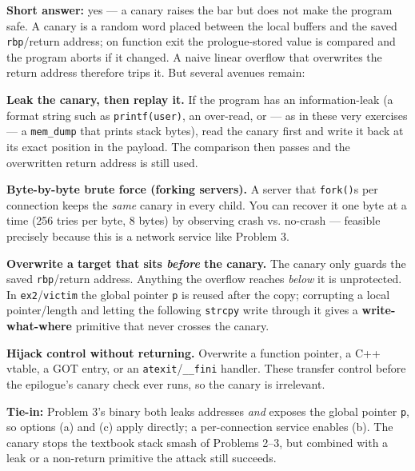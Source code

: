 \documentclass[a4paper, 10pt]{article}
\begin{document}
\begin{solution}
	\noindent \textbf{Short answer:} yes --- a canary raises the bar but does not make the program safe.
	A canary is a random word placed between the local buffers and the saved \texttt{rbp}/return address;
	on function exit the prologue-stored value is compared and the program aborts if it changed. A naive
	linear overflow that overwrites the return address therefore trips it. But several avenues remain:

	\begin{subproblems}
		\item \textbf{Leak the canary, then replay it.} If the program has an information-leak (a format
			string such as \texttt{printf(user)}, an over-read, or --- as in these very exercises --- a
			\texttt{mem\_dump} that prints stack bytes), read the canary first and write it back at its
			exact position in the payload. The comparison then passes and the overwritten return address is
			still used.
		\item \textbf{Byte-by-byte brute force (forking servers).} A server that \texttt{fork()}s per
			connection keeps the \emph{same} canary in every child. You can recover it one byte at a time
			(256 tries per byte, 8 bytes) by observing crash vs. no-crash --- feasible precisely because
			this is a network service like Problem 3.
		\item \textbf{Overwrite a target that sits \emph{before} the canary.} The canary only guards the
			saved \texttt{rbp}/return address. Anything the overflow reaches \emph{below} it is unprotected.
			In \texttt{ex2}/\texttt{victim} the global pointer \texttt{p} is reused after the copy; corrupting
			a local pointer/length and letting the following \texttt{strcpy} write through it gives a
			\textbf{write-what-where} primitive that never crosses the canary.
		\item \textbf{Hijack control without returning.} Overwrite a function pointer, a C++ vtable, a GOT
			entry, or an \texttt{atexit}/\texttt{\_\_fini} handler. These transfer control before the
			epilogue's canary check ever runs, so the canary is irrelevant.
	\end{subproblems}

	\noindent \textbf{Tie-in:} Problem 3's binary both leaks addresses \emph{and} exposes the global
	pointer \texttt{p}, so options (a) and (c) apply directly; a per-connection service enables (b). The
	canary stops the textbook stack smash of Problems 2--3, but combined with a leak or a non-return
	primitive the attack still succeeds.
\end{solution}
\end{document}
